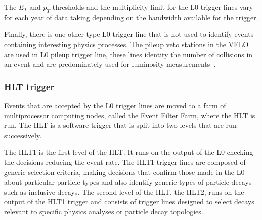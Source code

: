 
The $E_{T}$ and $p_{T}$ thresholds and the multiplicity limit for the L0 trigger lines vary for each year of data taking depending on the bandwidth available for the trigger. %

Finally, there is one other type L0 trigger line that is not used to identify events containing interesting physics processes. The pileup veto stations in the VELO are used in L0 pileup trigger line, these lines identity the number of collisions in an event and are predominately used for luminosity measurements~\cite{Aaij:2011er}.

\subsubsection{HLT trigger}
\label{HLT}

Events that are accepted by the L0 trigger lines are moved to a farm of multiprocessor computing nodes, called the Event Filter Farm, where the HLT is run. The HLT is a software trigger that is split into two levels that are run successively. 

The HLT1 is the first level of the HLT. It runs on the output of the L0 checking the decisions reducing the event rate. %
The HLT1 trigger lines are composed of generic selection criteria, making decisions that confirm those made in the L0 about particular particle types and also identify generic types of particle decays such as inclusive \bhadron decays. 
The second level of the HLT, the HLT2, runs on the output of the HLT1 trigger and consists of trigger lines designed to select decays relevant to specific physics analyses or particle decay topologies.




